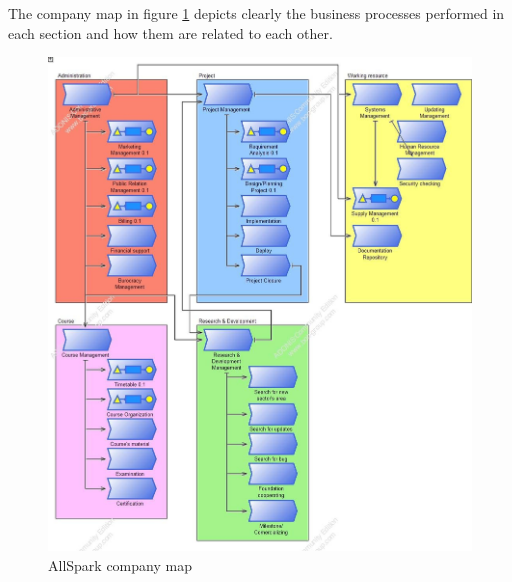 The company map in figure \ref{2img:cmap} depicts clearly the business processes
performed in each section and how them are related to each other.

\begin{figure}
\begin{centering}
\includegraphics[scale=0.40]{assign2/adonis/imgs/companymap.jpg}
\caption{AllSpark company map}
\label{2img:cmap}
\end{centering}
\end{figure}


